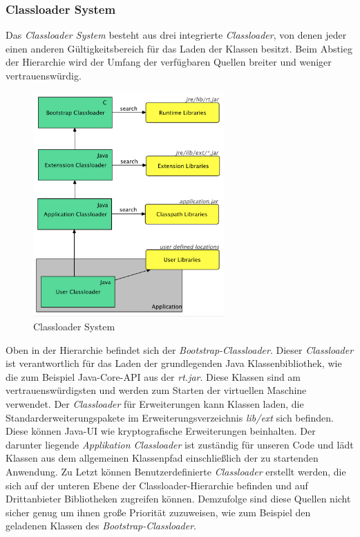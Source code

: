 \subsubsection{Classloader System}
Das \textit{Classloader System} besteht aus drei integrierte \textit{Classloader}, von denen jeder einen anderen Gültigkeitsbereich für das Laden der Klassen besitzt. Beim Abstieg der Hierarchie wird der Umfang der verfügbaren Quellen breiter und weniger vertrauenswürdig.
\begin{figure}[h!]
  \centering
  \includegraphics[width=0.65\textwidth]{material/images/Classloader.png}
  \caption{Classloader System}
  \label{fig:Classloader}
\end{figure}
\newline
Oben in der Hierarchie befindet sich der \textit{Bootstrap-Classloader}. Dieser \textit{Classloader} ist verantwortlich für das Laden der grundlegenden Java Klassenbibliothek, wie die zum Beispiel Java-Core-API aus der \textit{rt.jar}. Diese Klassen sind am vertrauenswürdigsten und werden zum Starten der virtuellen Maschine verwendet. Der \textit{Classloader} für Erweiterungen kann Klassen laden, die Standarderweiterungspakete im Erweiterungsverzeichnis \textit{lib/ext} sich befinden. Diese können Java-UI wie kryptografische Erweiterungen beinhalten. Der darunter liegende \textit{Applikation Classloader} ist zuständig für unseren Code und lädt Klassen aus dem allgemeinen Klassenpfad einschließlich der zu startenden Anwendung. Zu Letzt können Benutzerdefinierte \textit{Classloader} erstellt werden, die sich auf der unteren Ebene der Classloader-Hierarchie befinden und auf Drittanbieter Bibliotheken zugreifen können. Demzufolge sind diese Quellen nicht sicher genug um ihnen große Priorität zuzuweisen, wie zum Beispiel den geladenen Klassen des \textit{Bootstrap-Classloader}. 

